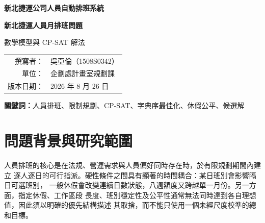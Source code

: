 \documentclass[a4paper,12pt]{article}
\begin{document}
\begin{titlepage}
  \centering
  \vspace*{3.2cm}
  {\Large\bfseries 新北捷運公司人員自動排班系統\par}
  \vspace{1.2cm}
  {\LARGE\bfseries\color{NtmcBlue} 新北捷運人員月排班問題\par}
  \vspace{0.4cm}
  {\Large 數學模型與 CP-SAT 解法\par}
  \vfill
  \begin{tabular}{rl}
    撰寫者：& 吳亞倫（1508S0342）\\
    單位：& 企劃處計畫室規劃課\\
    版本日期：& 2026 年 8 月 26 日
  \end{tabular}
  \vfill
\end{titlepage}

\begin{abstract}
  本文研究都市軌道運輸站務與檢修人員之月排班問題，並分別建立適用於三鶯線與環狀線
  站務單位（M、YM）及檢修單位（T、YT）的限制最佳化模型。模型以完整前月班表、目標月
  人力需求、人員屬性、指定休假、固定勤務及八週休假週期為已知資料，決定每位人員每日
  的工作地點、班別與休假種類。可行域同時刻畫每日唯一指派、站點覆蓋、最少十一小時
  休息、連續七日一般休假及八週休假額度等條件；班組人力品質與其他偏好則轉化為非負
  整數違反量，並以
  字典序目標維持不同管理目的間的優先關係。求解採用 CP-SAT，透過布林變數、整數變數、
  重述限制與分段線性化表達離散排班邏輯。為妥善處理月界，規劃範圍向次月延伸七日，並
  由歷史班表初始化跨月狀態。除最優化主班表外，本文亦定義提示解、有限時間搜尋及具最小
  漢明距離之替代候選生成方法。所建模型兼顧法規可行性、營運覆蓋、工作型態與群組內公平，
  且各項目標皆可分解為明確的違反量與權重，因而具備可驗證性與可解釋性。
\end{abstract}

\noindent\textbf{關鍵詞：}人員排班、限制規劃、CP-SAT、字典序最佳化、休假公平、候選解

\tableofcontents
\clearpage

\section{問題背景與研究範圍}

人員排班的核心是在法規、營運需求與人員偏好同時存在時，於有限規劃期間內建立
逐人逐日的可行指派。硬性條件之間具有顯著的時間耦合：某日班別會影響隔日可選班別，
一般休假會改變連續日數狀態，八週額度又跨越單一月份。另一方面，指定休假、工作區段
長度、班別穩定性及公平性通常無法同時達到各自理想值，因此須以明確的優先結構描述
其取捨，而不能只使用一個未經尺度校準的總和目標。
\end{document}
